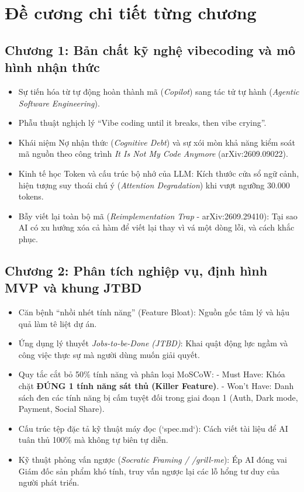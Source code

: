 \documentclass[a4paper,11pt]{article}
\begin{document}
\section{Đề cương chi tiết từng chương}

\subsection{Chương 1: Bản chất kỹ nghệ vibecoding và mô hình nhận thức}
\begin{itemize}[leftmargin=1.5em]
    \item Sự tiến hóa từ tự động hoàn thành mã (\textit{Copilot}) sang tác tử tự hành (\textit{Agentic Software Engineering}).
    \item Phẫu thuật nghịch lý ``Vibe coding until it breaks, then vibe crying''.
    \item Khái niệm Nợ nhận thức (\textit{Cognitive Debt}) và sự xói mòn khả năng kiểm soát mã nguồn theo công trình \textit{It Is Not My Code Anymore} (arXiv:2609.09022).
    \item Kinh tế học Token và cấu trúc bộ nhớ của LLM: Kích thước cửa sổ ngữ cảnh, hiện tượng suy thoái chú ý (\textit{Attention Degradation}) khi vượt ngưỡng 30.000 tokens.
    \item Bẫy viết lại toàn bộ mã (\textit{Reimplementation Trap} - arXiv:2609.29410): Tại sao AI có xu hướng xóa cả hàm để viết lại thay vì vá một dòng lỗi, và cách khắc phục.
\end{itemize}

\subsection{Chương 2: Phân tích nghiệp vụ, định hình MVP và khung JTBD}
\begin{itemize}[leftmargin=1.5em]
    \item Căn bệnh ``nhồi nhét tính năng'' (Feature Bloat): Nguồn gốc tâm lý và hậu quả làm tê liệt dự án.
    \item Ứng dụng lý thuyết \textit{Jobs-to-be-Done (JTBD)}: Khai quật động lực ngầm và công việc thực sự mà người dùng muốn giải quyết.
    \item Quy tắc cắt bỏ 50\% tính năng và phân loại MoSCoW:
        - Must Have: Khóa chặt \textbf{ĐÚNG 1 tính năng sát thủ (Killer Feature)}.
        - Won't Have: Danh sách đen các tính năng bị cấm tuyệt đối trong giai đoạn 1 (Auth, Dark mode, Payment, Social Share).
    \item Cấu trúc tệp đặc tả kỹ thuật máy đọc (`spec.md`): Cách viết tài liệu để AI tuân thủ 100\% mà không tự biên tự diễn.
    \item Kỹ thuật phỏng vấn ngược (\textit{Socratic Framing / /grill-me}): Ép AI đóng vai Giám đốc sản phẩm khó tính, truy vấn ngược lại các lỗ hổng tư duy của người phát triển.
\end{itemize}
\end{document}
